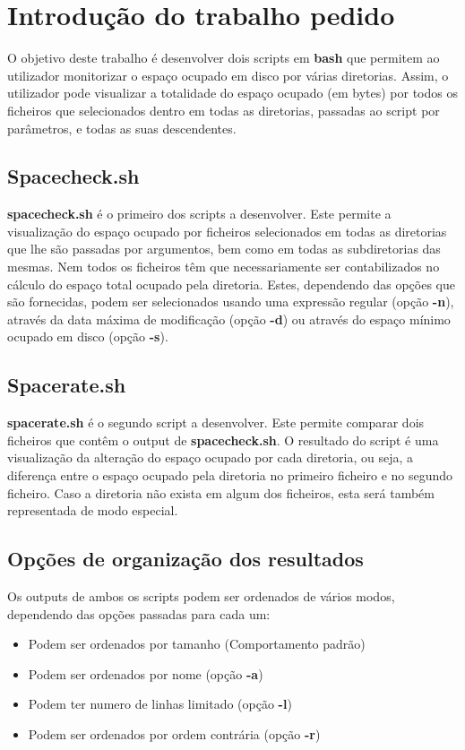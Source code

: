 \chapter{Introdução do trabalho pedido}
O objetivo deste trabalho é desenvolver dois scripts em \textbf{bash} que permitem ao utilizador monitorizar o espaço ocupado em disco por várias diretorias. Assim, o utilizador pode visualizar a totalidade do espaço ocupado (em bytes) por todos os ficheiros que selecionados dentro em todas as diretorias, passadas ao script por parâmetros, e todas as suas descendentes.
\section{Spacecheck.sh}
\label{cap1.1}
\textbf{spacecheck.sh} é o primeiro dos scripts a desenvolver. Este permite a visualização do espaço ocupado por ficheiros selecionados em todas as diretorias que lhe são passadas por argumentos, bem como em todas as subdiretorias das mesmas. 
Nem todos os ficheiros têm que necessariamente ser contabilizados no cálculo do espaço total ocupado pela diretoria.
Estes, dependendo das opções que são fornecidas, podem ser selecionados usando uma expressão regular (opção \textbf{-n}), através da data máxima de modificação (opção \textbf{-d}) ou através do espaço mínimo ocupado em disco (opção \textbf{-s}).
\section{Spacerate.sh}
\textbf{spacerate.sh} é o segundo script a desenvolver. Este permite comparar dois ficheiros que contêm o output de \textbf{spacecheck.sh}. O resultado do script é uma visualização da alteração do espaço ocupado por cada diretoria, ou seja, a diferença entre o espaço ocupado pela diretoria no primeiro ficheiro e no segundo ficheiro. Caso a diretoria não exista em algum dos ficheiros, esta será também representada de modo especial.
\section{Opções de organização dos resultados}
\label{cap1.3}
Os outputs de ambos os scripts podem ser ordenados de vários modos, dependendo das opções passadas para cada um:
\begin{itemize}
    \item Podem ser ordenados por tamanho (Comportamento padrão)
    \item Podem ser ordenados por nome (opção \textbf{-a})
    \item Podem ter numero de linhas limitado (opção \textbf{-l})
    \item Podem ser ordenados por ordem contrária (opção \textbf{-r})
\end{itemize}
